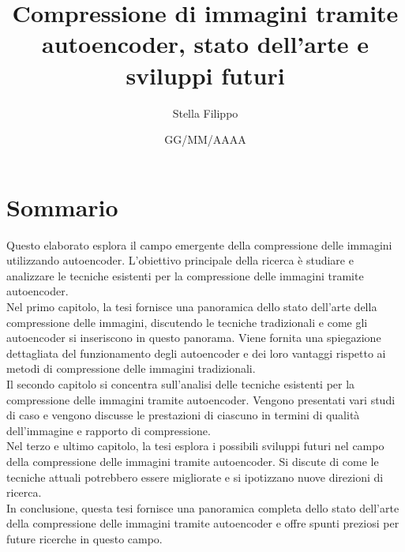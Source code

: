 \documentclass[12pt,a4paper,twoside,openright]{extreport}
\title{Compressione di immagini tramite autoencoder, stato dell’arte e sviluppi futuri}
\author{Stella Filippo}
\date{GG/MM/AAAA}
\begin{document}
    \pagestyle{empty} %

    
    \cleardoublepage
    
    
    \cleardoublepage

    \pagestyle{plain} %

    \chapter*{Sommario}
    Questo elaborato esplora il campo emergente della compressione delle immagini utilizzando autoencoder. L’obiettivo principale della ricerca è studiare e analizzare le tecniche esistenti per la compressione delle immagini tramite autoencoder.\\
    Nel primo capitolo, la tesi fornisce una panoramica dello stato dell’arte della compressione delle immagini, discutendo le tecniche tradizionali e come gli autoencoder si inseriscono in questo panorama. Viene fornita una spiegazione dettagliata del funzionamento degli autoencoder e dei loro vantaggi rispetto ai metodi di compressione delle immagini tradizionali.\\
    Il secondo capitolo si concentra sull’analisi delle tecniche esistenti per la compressione delle immagini tramite autoencoder. Vengono presentati vari studi di caso e vengono discusse le prestazioni di ciascuno in termini di qualità dell’immagine e rapporto di compressione.\\
    Nel terzo e ultimo capitolo, la tesi esplora i possibili sviluppi futuri nel campo della compressione delle immagini tramite autoencoder. Si discute di come le tecniche attuali potrebbero essere migliorate e si ipotizzano nuove direzioni di ricerca.\\
    In conclusione, questa tesi fornisce una panoramica completa dello stato dell’arte della compressione delle immagini tramite autoencoder e offre spunti preziosi per future ricerche in questo campo.\\

    \cleardoublepage

    \tableofcontents
    \cleardoublepage
    
    \listoffigures
    \cleardoublepage 

    \setcounter{figure}{0} 
    
    
    
    
    
    
    
    \cleardoublepage

    \printbibliography[heading=bibintoc]
\end{document}
